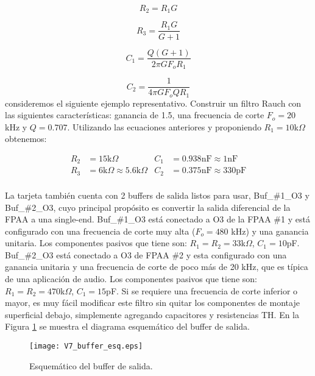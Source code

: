 	\begin{equation}
		R_{2} = R_{1} G
	\end{equation}
	
	\begin{equation}
		R_{3} = \frac{R_{1} G}{G + 1}
	\end{equation}
	
	\begin{equation}
		C_{1} = \frac{Q (G + 1)}{2 \pi G F_{o} R_{1}}
	\end{equation}
	
	\begin{equation}
		C_{2} = \frac{1}{4 \pi G F_{o} Q R_{1}}
	\end{equation}
	consideremos el siguiente ejemplo representativo. Construir un filtro Rauch con las siguientes características: ganancia de 1.5, una frecuencia de corte $F_{o} = 20$ kHz y $Q = 0.707$. Utilizando las ecuaciones anteriores y proponiendo $R_{1} = 10$k$\Omega$ obtenemos:
	
	\vspace{-1cm}
	\begin{align*}
		R_{2}	&=	15\mathrm{k}\Omega		& C_{1}	&=	0.938\mathrm{nF} \approx	1\mathrm{nF}\\
		R_{3}	&=	6\mathrm{k}\Omega \approx	5.6\mathrm{k}\Omega		& C_{2}	&=	0.375\mathrm{nF} \approx	330\mathrm{pF}\\
	\end{align*}	
	
	\vspace{-1cm}
	La tarjeta también cuenta con 2 buffers de salida listos para usar, Buf\_\#1\_O3 y Buf\_\#2\_O3, cuyo principal propósito es convertir la salida diferencial de la FPAA a una single-end. 
	Buf\_\#1\_O3 está conectado a O3 de la FPAA \#1 y está configurado con una frecuencia de corte muy alta ($F_{o} = 480$ kHz) y una ganancia unitaria. Los componentes pasivos que tiene son: $R_{1} = R_{2} = 33$k$\Omega$, $C_{1} = 10$pF. Buf\_\#2\_O3 está conectado a O3 de FPAA \#2 y esta configurado con una ganancia unitaria y una frecuencia de corte de poco más de 20 kHz, que es típica de una aplicación de audio. Los componentes pasivos que tiene son: $R_{1} = R_{2} = 470$k$\Omega$, $C_{1} = 15$pF. Si se requiere una frecuencia de corte inferior o mayor, es muy fácil modificar este filtro sin quitar los componentes de montaje superficial debajo, simplemente agregando capacitores y resistencias TH. En la Figura \ref{fig:V7_buffer_esq} se muestra el diagrama esquemático del buffer de salida.
	\begin{figure}[!hbp] 
		\caption{Esquemático del buffer de salida.}
		\label{fig:V7_buffer_esq}
		\centering
		\texttt{[image: V7\_buffer\_esq.eps]}
	\end{figure}
	
